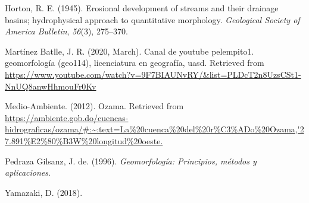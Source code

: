 \documentclass[11pt,]{article}
\begin{document}
\hypertarget{ref-horton1945erosional}{}
Horton, R. E. (1945). Erosional development of streams and their
drainage basins; hydrophysical approach to quantitative morphology.
\emph{Geological Society of America Bulletin}, \emph{56}(3), 275--370.

\hypertarget{ref-pelempito12020}{}
Martínez Batlle, J. R. (2020, March). Canal de youtube pelempito1.
geomorfología (geo114), licenciatura en geografía, uasd. Retrieved from
\url{https://www.youtube.com/watch?v=9F7BIAUNvRY/\&list=PLDcT2n8UzsCSt1-NnUQ8anwHhmouFr0Kv}

\hypertarget{ref-medioambiente}{}
Medio-Ambiente. (2012). Ozama. Retrieved from
\url{https://ambiente.gob.do/cuencas-hidrograficas/ozama/\#:~:text=La\%20cuenca\%20del\%20r\%C3\%ADo\%20Ozama,'27.891\%E2\%80\%B3W\%20longitud\%20oeste.}

\hypertarget{ref-pedraza1996geomorfologia}{}
Pedraza Gilsanz, J. de. (1996). \emph{Geomorfología: Principios, métodos
y aplicaciones}.

\hypertarget{ref-daiyamazaki2018}{}
Yamazaki, D. (2018).




\newpage
\singlespacing 
\end{document}
